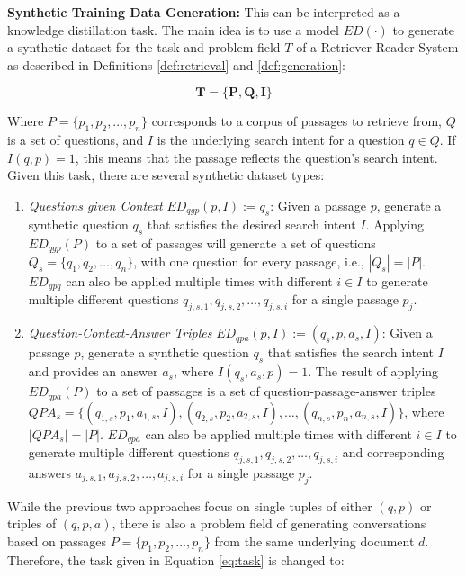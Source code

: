 \vspace{\baselineskip} %
\noindent\textbf{Synthetic Training Data Generation:} This can be interpreted as a knowledge distillation task. The main idea is to use a model $ED(\cdot)$ to generate a synthetic dataset for the task and problem field $T$ of a Retriever-Reader-System as described in Definitions \ref{def:retrieval} and \ref{def:generation}:

\begin{equation}
    \mathbf{T = \{P, Q, I\}}
    \label{eq:task}
\end{equation}

Where $P = \{p_1, p_2, \dots, p_n\}$ corresponds to a corpus of passages to retrieve from, $Q$ is a set of questions, and $I$ is the underlying search intent for a question $q \in Q$. If $I(q,p) = 1$, this means that the passage reflects the question's search intent. Given this task, there are several synthetic dataset types:

\begin{enumerate}
    \item \textit{Questions given Context} $ED_{qgp}(p,I) := q_s$: Given a passage $p$, generate a synthetic question $q_s$ that satisfies the desired search intent $I$. Applying $ED_{qgp}(P)$ to a set of passages will generate a set of questions $Q_s = \{q_1, q_2, \dots, q_n\}$, with one question for every passage, i.e., $|Q_s| = |P|$. $ED_{gpq}$ can also be applied multiple times with different $i \in I$ to generate multiple different questions $q_{j,s,1}, q_{j,s,2}, \dots , q_{j,s,i}$ for a single passage $p_j$.
    \item \textit{Question-Context-Answer Triples} $ED_{qpa}(p, I) := (q_s, p, a_s, I)$: Given a passage $p$, generate a synthetic question $q_s$ that satisfies the search intent $I$ and provides an answer $a_s$, where $I(q_s, a_s, p) = 1$. The result of applying $ED_{qpa}(P)$ to a set of passages is a set of question-passage-answer triples $QPA_s = \allowbreak \{(q_{1,s}, p_1, a_{1,s}, I), \allowbreak (q_{2,s}, p_2, a_{2,s}, I), \allowbreak \dots, (q_{n,s}, p_n, a_{n,s}, I)\}$, where $|QPA_s| = |P|$. $ED_{qpa}$ can also be applied multiple times with different $i \in I$ to generate multiple different questions $q_{j,s,1}, \allowbreak q_{j,s,2}, \dots , q_{j,s,i}$ and corresponding answers $a_{j,s,1}, \allowbreak a_{j,s,2}, \dots , a_{j,s,i}$ for a single passage $p_j$.
\end{enumerate}

While the previous two approaches focus on single tuples of either $(q,p)$ or triples of $(q,p,a)$, there is also a problem field of generating conversations based on passages $P = \{p_1, p_2, \dots, p_n\}$ from the same underlying document $d$. Therefore, the task given in Equation \ref{eq:task} is changed to:

